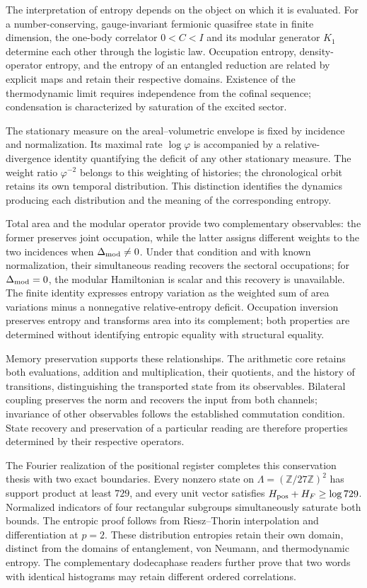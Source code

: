 The interpretation of entropy depends on the object on which it is
evaluated. For a number-conserving, gauge-invariant fermionic quasifree
state in finite dimension, the one-body correlator \(0<C<I\) and its
modular generator \(K_1\) determine each other through the logistic law.
Occupation entropy, density-operator entropy, and the entropy of an
entangled reduction are related by explicit maps and retain their
respective domains. Existence of the thermodynamic limit requires
independence from the cofinal sequence; condensation is characterized
by saturation of the excited sector.

The stationary measure on the areal--volumetric envelope is fixed
by incidence and normalization. Its maximal rate \(\log\varphi\)
is accompanied by a relative-divergence identity quantifying the
deficit of any other stationary measure. The weight ratio
\(\varphi^{-2}\) belongs to this weighting of histories;
the chronological orbit retains its own temporal distribution.
This distinction identifies the dynamics producing each distribution
and the meaning of the corresponding entropy.

Total area and the modular operator provide two complementary
observables: the former preserves joint occupation, while the latter
assigns different weights to the two incidences when \(\Delta_{\rm mod}\ne0\).
Under that condition and with known normalization, their simultaneous
reading recovers the sectoral occupations; for \(\Delta_{\rm mod}=0\),
the modular Hamiltonian is scalar and this recovery is unavailable.
The finite identity expresses entropy variation as the weighted sum
of area variations minus a nonnegative relative-entropy deficit.
Occupation inversion preserves entropy
and transforms area into its complement; both properties are
determined without identifying entropic equality with structural
equality.

Memory preservation supports these relationships. The arithmetic
core retains both evaluations, addition and multiplication, their
quotients, and the history of transitions, distinguishing the
transported state from its observables. Bilateral coupling preserves
the norm and recovers the input from both channels; invariance of
other observables follows the established commutation condition.
State recovery and preservation of a particular reading are therefore
properties determined by their respective operators.

The Fourier realization of the positional register completes this
conservation thesis with two exact boundaries. Every nonzero state on
\(\Lambda=(\mathbb Z/27\mathbb Z)^2\) has support product at least
\(729\), and every unit vector satisfies
\(H_{\rm pos}+H_F\ge\log729\). Normalized indicators of four rectangular
subgroups simultaneously saturate both bounds. The entropic proof follows
from Riesz--Thorin interpolation and differentiation at \(p=2\). These
distribution entropies retain their own domain, distinct from the domains
of entanglement, von Neumann, and thermodynamic entropy. The complementary
dodecaphase readers further prove that two words with identical histograms
may retain different ordered correlations.

